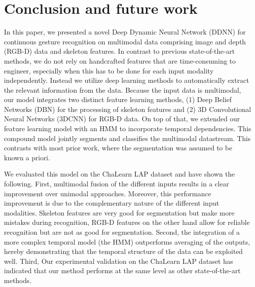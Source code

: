 
\section{Conclusion and future work}
\label{sec:conclusion}

%
In this paper, we presented a novel Deep Dynamic Neural Network (DDNN) for continuous gesture recognition on multimodal data comprising image and depth (RGB-D) data and skeleton features. %
In contrast to previous state-of-the-art methods, we do not rely on handcrafted features that are time-consuming to engineer, especially when this has to be done for each input modality independently. Instead we utilize deep learning methods to automatically extract the relevant information from the data.
Because the input data is multimodal, our model integrates two distinct feature learning methods, (1) Deep Belief Networks (DBN) for the processing of skeleton features and (2) 3D Convolutional Neural Networks (3DCNN) for RGB-D data. On top of that, we  extended our feature learning model with an HMM to incorporate temporal dependencies.
This compound model  jointly segments and classifies the multimodal datastream. This contrasts with most prior work, where the segmentation was assumed to be known a priori.

We evaluated this model on the ChaLearn LAP dataset and have shown the following.  First, multimodal fusion of the different inputs results in a clear improvement over unimodal approaches. Moreover, this performance improvement is due to the complementary nature of the different input modalities. Skeleton features are very good for segmentation but make more mistakes during recognition, RGB-D features on the other hand allow for reliable recognition but are not as good for segmentation.
Second, the integration of a more complex temporal model (the HMM) outperforms averaging of the outputs, hereby demonstrating that the temporal structure of the data can be exploited well. Third,
Our experimental validation on the ChaLearn LAP dataset has indicated that our method performs at the same level as other state-of-the-art methods.

